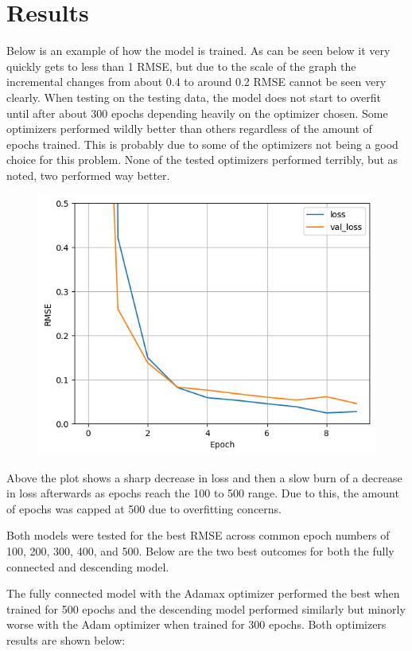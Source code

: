 \documentclass[12pt]{article}
\begin{document}
	\section*{Results}

	Below is an example of how the model is trained. As can be seen below it very quickly gets to less than 1 RMSE, but due to the scale of the graph the incremental changes from about 0.4 to around 0.2 RMSE cannot be seen very clearly. When testing on the testing data, the model does not start to overfit until after about 300 epochs depending heavily on the optimizer chosen. Some optimizers performed wildly better than others regardless of the amount of epochs trained. This is probably due to some of the optimizers not being a good choice for this problem. None of the tested optimizers performed terribly, but as noted, two performed way better.

	\begin{figure}[H]
		\includegraphics[scale=0.400]{loss_example.png}
		\centering
	\end{figure}


	Above the plot shows a sharp decrease in loss and then a slow burn of a decrease in loss afterwards as epochs reach the 100 to 500 range. Due to this, the amount of epochs was capped at 500 due to overfitting concerns.

	Both models were tested for the best RMSE across common epoch numbers of 100, 200, 300, 400, and 500. Below are the two best outcomes for both the fully connected and descending model.

	The fully connected model with the Adamax optimizer performed the best when trained for 500 epochs and the descending model performed similarly but minorly worse with the Adam optimizer when trained for 300 epochs. Both optimizers results are shown below:
\end{document}
